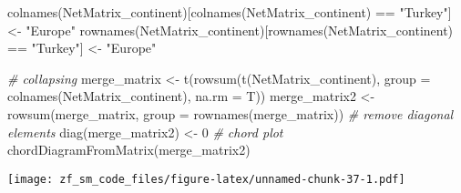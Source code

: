 \documentclass[
]{article}
\newenvironment{Shaded}{\begin{snugshade}}{\end{snugshade}}
\newcommand{\AttributeTok}[1]{\textcolor[rgb]{0.77,0.63,0.00}{#1}}
\newcommand{\CommentTok}[1]{\textcolor[rgb]{0.56,0.35,0.01}{\textit{#1}}}
\newcommand{\DecValTok}[1]{\textcolor[rgb]{0.00,0.00,0.81}{#1}}
\newcommand{\FunctionTok}[1]{\textcolor[rgb]{0.00,0.00,0.00}{#1}}
\newcommand{\NormalTok}[1]{#1}
\newcommand{\OtherTok}[1]{\textcolor[rgb]{0.56,0.35,0.01}{#1}}
\newcommand{\SpecialCharTok}[1]{\textcolor[rgb]{0.00,0.00,0.00}{#1}}
\newcommand{\StringTok}[1]{\textcolor[rgb]{0.31,0.60,0.02}{#1}}
\begin{document}
\begin{Shaded}
\begin{Highlighting}[]
\FunctionTok{colnames}\NormalTok{(NetMatrix\_continent)[}\FunctionTok{colnames}\NormalTok{(NetMatrix\_continent) }\SpecialCharTok{==} \StringTok{"Turkey"}\NormalTok{] }\OtherTok{\textless{}{-}} \StringTok{"Europe"}
\FunctionTok{rownames}\NormalTok{(NetMatrix\_continent)[}\FunctionTok{rownames}\NormalTok{(NetMatrix\_continent) }\SpecialCharTok{==} \StringTok{"Turkey"}\NormalTok{] }\OtherTok{\textless{}{-}} \StringTok{"Europe"}


\CommentTok{\# collapsing}
\NormalTok{merge\_matrix }\OtherTok{\textless{}{-}} \FunctionTok{t}\NormalTok{(}\FunctionTok{rowsum}\NormalTok{(}\FunctionTok{t}\NormalTok{(NetMatrix\_continent), }\AttributeTok{group =} \FunctionTok{colnames}\NormalTok{(NetMatrix\_continent), }\AttributeTok{na.rm =}\NormalTok{ T))}
\NormalTok{merge\_matrix2 }\OtherTok{\textless{}{-}} \FunctionTok{rowsum}\NormalTok{(merge\_matrix, }\AttributeTok{group =} \FunctionTok{rownames}\NormalTok{(merge\_matrix))}
\CommentTok{\# remove diagonal elements}
\FunctionTok{diag}\NormalTok{(merge\_matrix2) }\OtherTok{\textless{}{-}} \DecValTok{0}
\CommentTok{\# chord plot}
\FunctionTok{chordDiagramFromMatrix}\NormalTok{(merge\_matrix2)}
\end{Highlighting}
\end{Shaded}

\texttt{[image: zf\_sm\_code\_files/figure-latex/unnamed-chunk-37-1.pdf]}
\end{document}
